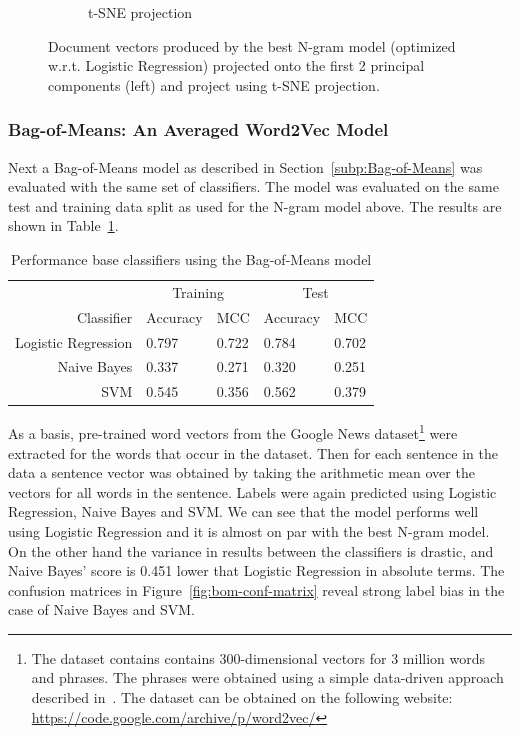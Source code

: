 \begin{figure}[h]
\begin{subfigure}[b]{0.48\textwidth}
      \caption{t-SNE projection}
\label{fig:ngram-tsne}
    \end{subfigure}
    \caption{Document vectors produced by the best N-gram model (optimized w.r.t. Logistic Regression) projected onto the first 2 principal components (left) and project using t-SNE projection.}
\label{fig:ngram pca and tsne}
\end{figure}

\subsubsection{Bag-of-Means: An Averaged Word2Vec Model}
\label{subs:Bag-of-Means: An Averaged Word2Vec Model}

Next a Bag-of-Means model as described in Section~\ref{subp:Bag-of-Means} was evaluated with the same set of classifiers. The model was evaluated on the same test and training data split as used for the N-gram model above. The results are shown in Table~\ref{tab:Bag-Of-Means Results}.

\begin{table}[h]
  \begin{center}
  \begin{tabular}{ r | *2l | *2l }
    \toprule
     & \multicolumn{2}{c|}{Training} & \multicolumn{2}{c}{Test}\\
    Classifier & Accuracy & MCC & Accuracy & MCC \\
    \midrule
    Logistic Regression & 0.797 & 0.722 & 0.784 & 0.702 \\
    Naive Bayes         & 0.337 & 0.271 & 0.320 & 0.251 \\
    SVM                 & 0.545 & 0.356 & 0.562 & 0.379 \\
    \bottomrule
  \end{tabular}
  \caption{Performance base classifiers using the Bag-of-Means model}
\label{tab:Bag-Of-Means Results}
\end{center}
\end{table}

As a basis, pre-trained word vectors from the Google News dataset\footnote{The dataset contains contains 300-dimensional vectors for 3 million words and phrases. The phrases were obtained using a simple data-driven approach described in~\cite{Mikolov:2013ab}. The dataset can be obtained on the following website: \url{https://code.google.com/archive/p/word2vec/}} were extracted for the words that occur in the dataset.
Then for each sentence in the data a sentence vector was obtained by taking the arithmetic mean over the vectors for all words in the sentence. Labels were again predicted using Logistic Regression, Naive Bayes and SVM.
We can see that the model performs well using Logistic Regression and it is almost on par with the best N-gram model. On the other hand the variance in results between the classifiers is drastic, and Naive Bayes' score is 0.451 lower that Logistic Regression in absolute terms. The confusion matrices in Figure~\ref{fig:bom-conf-matrix} reveal strong label bias in the case of Naive Bayes and SVM.

